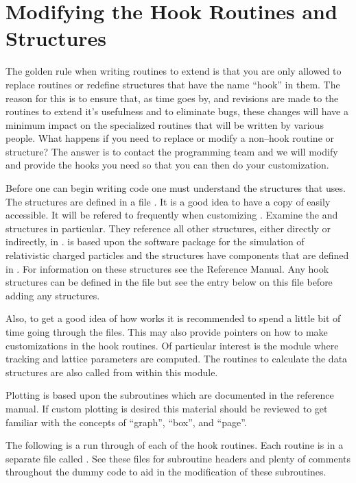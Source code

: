 \section{Modifying the Hook Routines and Structures}

The golden rule when writing routines to extend \tao is that you are
only allowed to replace routines or redefine structures that have the
name ``hook'' in them. The reason for this is to ensure that, as time
goes by, and revisions are made to the \tao routines to extend it's
usefulness and to eliminate bugs, these changes will
have a minimum impact on the specialized routines that will be written
by various people.  What happens if you need to replace
or modify a non--hook routine or structure?  The answer is to contact
the \tao programming team and we will modify \tao and provide the hooks 
you need so that you can then do your customization.

Before one can begin writing code one must understand the structures
that \tao uses. The structures are defined in a file
. It is a good idea to have a copy of
 easily accessible. It will be refered to frequently
when customizing \tao. Examine the  and
 structures in particular. They reference all other
structures, either directly or indirectly, in . 
\tao is based upon the \bmad software
package for the simulation of relativistic charged particles and the
\tao structures have components that are defined in \bmad. For
information on these structures see the \bmad Reference Manual. Any hook 
structures can be defined in the file  but see the entry
below on this file before adding any structures.

Also, to get a good idea of how \tao works it is recommended to spend a
little bit of time going through the  files. This may also
provide pointers on how to make customizations in the hook routines. Of
particular interest is the module  where tracking
and lattice parameters are computed. The routines to calculate the data structures
are also called from within this module.

Plotting is based upon the  subroutines which are documented in
the \bmad reference manual. If custom plotting is desired this material should
be reviewed to get familiar with the concepts of ``graph'', ``box'', and
``page''. 

The following is a run through of each of the hook routines. Each routine
is in a separate file called . See these
files for subroutine headers and plenty of comments throughout the dummy code to aid
in the modification of these subroutines.


